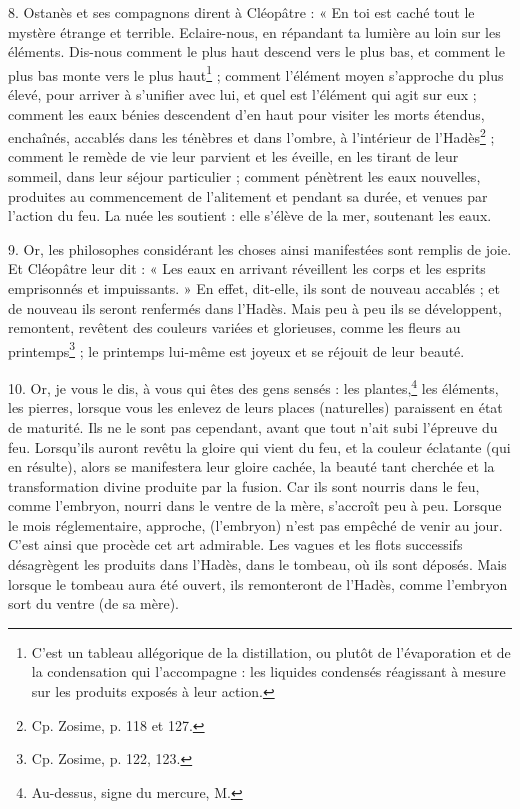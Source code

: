 \documentclass[a4paper, 11pt, oneside, polutonikogreek, french]{article}
\begin{document}
8. Ostanès et ses compagnons dirent à Cléopâtre : « En toi est caché tout le mystère étrange et terrible. Eclaire-nous, en répandant ta lumière au loin sur les éléments. Dis-nous comment le plus haut descend vers le plus bas, et comment le plus bas monte vers le plus haut\footnote{C'est un tableau allégorique de la distillation, ou plutôt de l'évaporation et de la condensation qui l'accompagne : les liquides condensés réagissant à mesure sur les produits exposés à leur action.} ; comment l'élément moyen s'approche du plus élevé, pour arriver à s'unifier avec lui, et quel est l'élément qui agit sur eux ; comment les eaux bénies descendent d'en haut pour visiter les morts étendus, enchaînés, accablés dans les ténèbres et dans l'ombre, à l'intérieur de l'Hadès\footnote{Cp. Zosime, p. 118 et 127.} ; comment le remède de vie leur parvient et les éveille, en les tirant de leur sommeil, dans leur séjour particulier ; comment pénètrent les eaux nouvelles, produites au commencement de l'alitement et pendant sa durée, et venues par l'action du feu. La nuée les soutient : elle s'élève de la mer, soutenant les eaux.

9. Or, les philosophes considérant les choses ainsi manifestées sont remplis de joie. Et Cléopâtre leur dit : « Les eaux en arrivant réveillent les corps et les esprits emprisonnés et impuissants. » En effet, dit-elle, ils sont de nouveau accablés ; et de nouveau ils seront renfermés dans l'Hadès. Mais peu à peu ils se développent, remontent, revêtent des couleurs variées et glorieuses, comme les fleurs au printemps\footnote{Cp. Zosime, p. 122, 123.} ; le printemps lui-même est joyeux et se réjouit de leur beauté.

10. Or, je vous le dis, à vous qui êtes des gens sensés : les plantes,\footnote{Au-dessus, signe du mercure, M.} les éléments, les pierres, lorsque vous les enlevez de leurs places (naturelles) paraissent en état de maturité. Ils ne le sont pas cependant, avant que tout n'ait subi l'épreuve du feu. Lorsqu'ils auront revêtu la gloire qui vient du feu, et la couleur éclatante (qui en résulte), alors se manifestera leur gloire cachée, la beauté tant cherchée et la transformation divine produite par la fusion. Car ils sont nourris dans le feu, comme l'embryon, nourri dans le ventre de la mère, s'accroît peu à peu. Lorsque le mois réglementaire, approche, (l'embryon) n'est pas empêché de venir au jour. C'est ainsi que procède cet art admirable. Les vagues et les flots successifs désagrègent les produits dans l'Hadès, dans le tombeau, où ils sont déposés. Mais lorsque le tombeau aura été ouvert, ils remonteront de l'Hadès, comme l'embryon sort du ventre (de sa mère).
\end{document}
